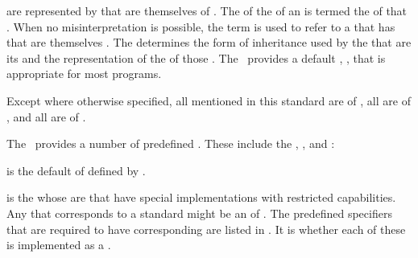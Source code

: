  are represented by  that are themselves
 of . 
The  of the  of an  is termed
the  of that . When no misinterpretation is
possible, the term  is used to refer to a 
that has  that are themselves . The 
determines the form of inheritance used by the  that are its
 and the representation of the  of those .
The \CLOS\ provides a default , , that is
appropriate for most programs.

Except where otherwise specified, all  mentioned in this
standard are  of ,
all  are  
of ,
and all  are  of .


\endsubSection%
%



The \CLOS\ provides a number of predefined . 
These include the  , 
, and :

\beginlist

\itemitem{\bull}
 is the default  of 
 defined by .
                        
\itemitem{\bull}  is the  whose
 are  that have special implementations with
restricted capabilities.  Any  that corresponds to a standard
 might be an  of .
The predefined  specifiers that are required to have
corresponding  are listed in \figref\ClassTypeCorrespondence.  
It is  whether each of these  
is implemented as a .

